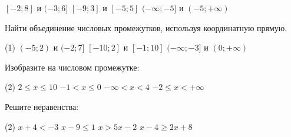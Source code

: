 \begin{consultation}[number=1]
\begin{listofex}
\begin{tasks}
			\task \( [-2;8] \) и \( (-3;6] \)
			\task \( [-9;3] \) и \( [-5;5] \)
			\task \( (-\infty;-5] \) и \( (-5;+\infty) \)
		\end{tasks}
		\item Найти объединение числовых промежутков, используя координатную прямую.
		\begin{tasks}(1)
			\task \( (-5;2) \) и \( (-2;7] \)
			\task \( [-10;2] \) и \( [-1;10] \)
			\task \( (-\infty;-3] \) и \( (0;+\infty) \)
		\end{tasks}
		\item Изобразите на числовом промежутке:
		\begin{tasks}(2)
			\task \( 2\leq x\leq 10\)
			\task \( -1< x\leq 0\)
			\task \( -\infty < x< 4\)
			\task \( -2\leq x<+\infty \)
		\end{tasks}
		\item Решите неравенства:
		\begin{tasks}(2)
			\task \( x+4<-3 \)
			\task \( x-9\leq 1 \)
			\task \( x>5x-2\)
			\task \( x-4\geq 2x+8\)
		\end{tasks}
	\end{listofex}
\end{consultation}
